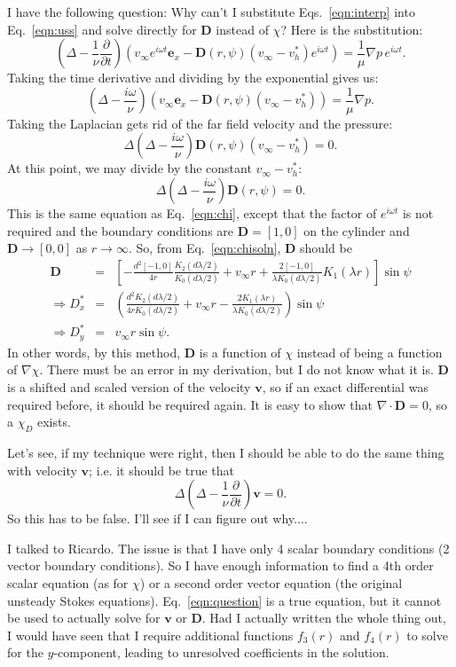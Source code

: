 \documentclass[11pt]{amsart}
\newcommand{\vinf}{v_{\infty}}
\newcommand{\om}{\omega}
\newcommand{\ex}{\mathbf{e}_x}
\newcommand{\bD}{\mathbf{D}}
\newcommand{\bv}{\mathbf{v}}
\newcommand{\bee}[1]{\begin{equation} #1 \end{equation}}
\newcommand{\bees}[1]{\begin{equation*} #1 \end{equation*}}
\newcommand{\baas}[1]{\begin{eqnarray*} #1 \end{eqnarray*}}
\newcommand{\pd}[2]{\ensuremath{\frac{\partial #1}{\partial #2}}}
\begin{document}
	I have the following question: Why can't I substitute Eqs.~\eqref{eqn:interp} into Eq.~\eqref{eqn:uss} and solve directly for $\bD$ instead of $\chi$? Here is the substitution:
	\bees{
	\left(\Delta-\frac{1}{\nu} \pd{}{t}\right) \left( \vinf e^{i\om t}\ex - \bD(r,\psi)(\vinf - v_h^*) e^{i\om t} \right) = \frac{1}{\mu}\nabla p\, e^{i\om t}.
	}
	Taking the time derivative and dividing by the exponential gives us:
	\bees{
	\left(\Delta-\frac{i\om}{\nu} \right) \left( \vinf \ex - \bD(r,\psi)(\vinf - v_h^*)  \right) = \frac{1}{\mu}\nabla p.
	}
	Taking the Laplacian gets rid of the far field velocity and the pressure:
	\bees{
	 \Delta\left(\Delta-\frac{i\om}{\nu} \right)\bD(r,\psi)(\vinf - v_h^*)  = 0.
	}
	At this point, we may divide by the constant $\vinf - v_h^*$:
	\bees{
	 \Delta\left(\Delta-\frac{i\om}{\nu} \right)\bD(r,\psi) = 0.
	}
	This is the same equation as Eq.~\eqref{eqn:chi}, except that the factor of $e^{i\om t}$ is not required and the boundary conditions are $\bD = [1,0]$ on the cylinder and $\bD \to [0,0]$ as $r \to \infty$. So, from Eq.~\eqref{eqn:chisoln}, $\bD$ should be
	\baas{
	\bD &=& \left[ -\frac{d^2[-1,0]}{4r}\frac{K_2(d\lambda/2)}{K_0(d\lambda/2)} + \vinf r + \frac{2[-1,0]}{\lambda K_0(d\lambda/2)}K_1(\lambda r)\right]\sin\psi \\
	\Rightarrow D_x^* &=& \left(\frac{d^2K_2(d\lambda/2)}{4rK_0(d\lambda/2)} + \vinf r - \frac{2K_1(\lambda r)}{\lambda K_0(d\lambda/2)}\right)\sin\psi \\
	\Rightarrow D_y^* &=& \vinf r\sin\psi.
	}
	In other words, by this method, $\bD$ is a function of $\chi$ instead of being a function of $\nabla \chi$. There must be an error in my derivation, but I do not know what it is. $\bD$ is a shifted and scaled version of the velocity $\bv$, so if an exact differential was required before, it should be required again. It is easy to show that $\nabla \cdot \bD = 0$, so a $\chi_D$ exists. 

	Let's see, if my technique were right, then I should be able to do the same thing with velocity $\bv$; i.e. it should be true that 
	\bee{
	\Delta\left(\Delta-\frac{1}{\nu}\pd{}{t} \right)\bv = 0. \label{eqn:question}
	}
	So this has to be false. I'll see if I can figure out why....

	I talked to Ricardo. The issue is that I have only 4 scalar boundary conditions (2 vector boundary conditions). So I have enough information to find a 4th order scalar equation (as for $\chi$) or a second order vector equation (the original unsteady Stokes equations). Eq.~\eqref{eqn:question} is a true equation, but it cannot be used to actually solve for $\bv$ or $\bD$. Had I actually written the whole thing out, I would have seen that I require additional functions $f_3(r)$ and $f_4(r)$ to solve for the $y$-component, leading to unresolved coefficients in the solution.
\end{document}
